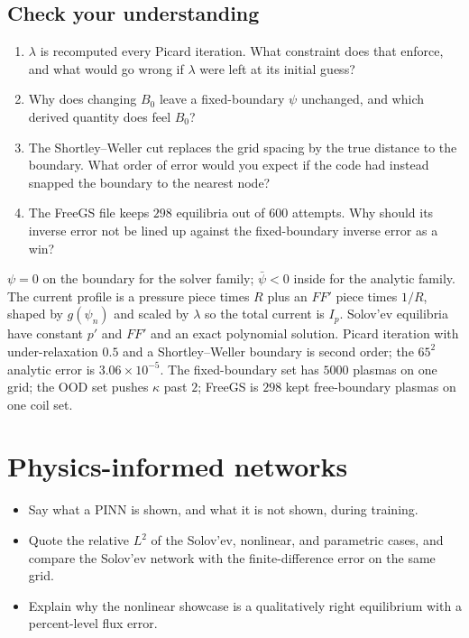 \documentclass[11pt,a4paper,oneside,openany]{book}
\numberwithin{equation}{chapter}
\newcommand{\psin}{\psi_{n}}
\newcommand{\psibar}{\bar{\psi}}
\newcommand{\Ip}{I_{p}}
\theoremstyle{definition}
\begin{document}
\section*{Check your understanding}
\begin{enumerate}[label=\textbf{Q9.\arabic*.},leftmargin=2.4em]
\item \(\lambda\) is recomputed every Picard iteration. What constraint does that enforce, and what would go wrong if \(\lambda\) were left at its initial guess?
\item Why does changing \(B_{0}\) leave a fixed-boundary \(\psi\) unchanged, and which derived quantity does feel \(B_{0}\)?
\item The Shortley--Weller cut replaces the grid spacing by the true distance to the boundary. What order of error would you expect if the code had instead snapped the boundary to the nearest node?
\item The FreeGS file keeps \(298\) equilibria out of \(600\) attempts. Why should its inverse error not be lined up against the fixed-boundary inverse error as a win?
\end{enumerate}

\begin{keyideas}
\(\psi=0\) on the boundary for the solver family; \(\psibar<0\) inside for the analytic family. The current profile is a pressure piece times \(R\) plus an \(FF'\) piece times \(1/R\), shaped by \(g(\psin)\) and scaled by \(\lambda\) so the total current is \(\Ip\). Solov'ev equilibria have constant \(p'\) and \(FF'\) and an exact polynomial solution. Picard iteration with under-relaxation \(0.5\) and a Shortley--Weller boundary is second order; the \(65^{2}\) analytic error is \(3.06\times 10^{-5}\). The fixed-boundary set has \(5000\) plasmas on one grid; the OOD set pushes \(\kappa\) past \(2\); FreeGS is \(298\) kept free-boundary plasmas on one coil set.
\end{keyideas}


\chapter{Physics-informed networks}
\label{ch:pinn}

\begin{objectives}
\begin{itemize}[leftmargin=1.2em]
\item Say what a PINN is shown, and what it is not shown, during training.
\item Quote the relative \(L^{2}\) of the Solov'ev, nonlinear, and parametric cases, and compare the Solov'ev network with the finite-difference error on the same grid.
\item Explain why the nonlinear showcase is a qualitatively right equilibrium with a percent-level flux error.
\end{itemize}
\end{objectives}
\end{document}
